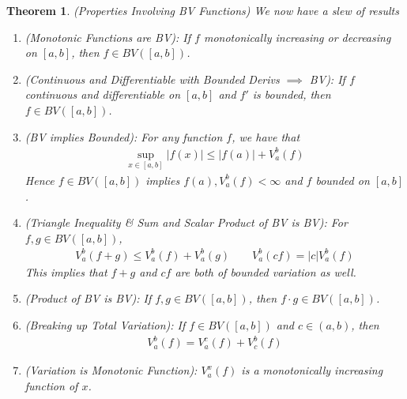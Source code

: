 \documentclass[12pt]{book}
\numberwithin{equation}{section} %
\theoremstyle{plain}
\newtheorem{thm}{Theorem}[section]
\theoremstyle{definition}
\theoremstyle{remark}
\begin{document}
\begin{thm}\emph{(Properties Involving BV Functions)}
We now have a slew of results
\begin{enumerate}[label=\emph{(\roman*)}]
  \item \emph{(Monotonic Functions are BV):}
    If $f$ monotonically increasing or decreasing on $[a,b]$, then $f\in
    BV([a,b])$.
  \item
    \emph{(Continuous and Differentiable with Bounded Derivs $\implies$ BV):}
    If $f$ continuous and differentiable on $[a,b]$ and $f'$ is bounded,
    then $f\in BV([a,b])$.
  \item \emph{(BV implies Bounded):}
    For any function $f$, we have that
    \begin{align}
      \sup_{x\in[a,b]} |f(x) | \leq |f(a)| + V_a^b(f)
      \label{bvbounded}
    \end{align}
    Hence $f\in BV([a,b])$ implies $f(a),V^b_a(f)<\infty$ and $f$
    bounded on $[a,b]$.

  \item
    \emph{(Triangle Inequality \& Sum and Scalar Product of BV is BV):}
    For $f, g\in BV([a,b])$,
    \begin{align*}
      V_a^b(f+g) \leq V_a^b(f) + V_a^b(g)
      \qquad V_a^b(cf) = |c|V_a^b(f)
    \end{align*}
    This implies that $f+g$ and $cf$ are both of bounded variation as
    well.

  \item \emph{(Product of BV is BV):}
    If $f,g\in BV([a,b])$, then $f\cdot g \in BV([a,b])$.

  \item \emph{(Breaking up Total Variation):}
    If $f\in BV([a,b])$ and $c \in (a,b)$, then
    \begin{align*}
      V_a^b(f) = V_a^c(f) + V_c^b(f)
    \end{align*}

  \item \emph{(Variation is Monotonic Function):}
    $V_a^x(f)$ is a monotonically increasing function of $x$.
\end{enumerate}
\end{thm}
\end{document}
